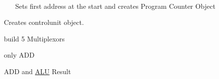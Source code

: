 ~\newline
~\newline
~\newline
~\newline
~\newline
~\newline
~\newline
~\newline
~\newline
~\newline
~\newline
~\newline
~\newline
~\newline
~\newline
~\newline
~\newline
~\newline
~\newline
~\newline
~\newline
~\newline
~\newline
~\newline
~\newline
~\newline
~\newline
~\newline
~\newline
~\newline
~\newline
~\newline
~\newline
~\newline
~\newline
~\newline
~\newline
~\newline
~\newline
~\newline
~\newline
~\newline
~\newline
~\newline
~\newline
 Sets first address at the start and creates Program Counter Object

Creates controlunit object.

build 5 Multiplexors

only A\+DD

A\+DD and \mbox{\hyperlink{class_a_l_u}{A\+LU}} Result


